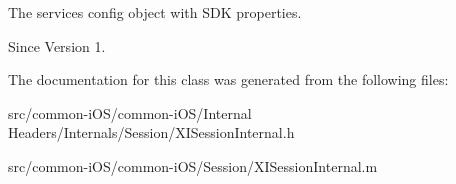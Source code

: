 The services config object with S\+DK properties. 

\begin{DoxySince}{Since}
Version 1. 
\end{DoxySince}


The documentation for this class was generated from the following files\+:\begin{DoxyCompactItemize}
\item 
src/common-\/i\+O\+S/common-\/i\+O\+S/\+Internal Headers/\+Internals/\+Session/X\+I\+Session\+Internal.\+h\item 
src/common-\/i\+O\+S/common-\/i\+O\+S/\+Session/X\+I\+Session\+Internal.\+m\end{DoxyCompactItemize}
